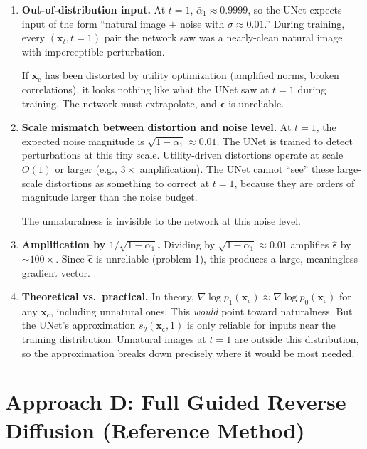 \documentclass[11pt]{article}
\newcommand{\xb}{\mathbf{x}}
\newcommand{\xc}{\xb_{\mathrm{c}}}  %
\newcommand{\eb}{\boldsymbol{\epsilon}}
\newcommand{\alphabar}{\bar{\alpha}}
\begin{document}
\begin{enumerate}
    \item \textbf{Out-of-distribution input.}
    At $t=1$, $\alphabar_1 \approx 0.9999$, so the UNet expects input of the form
    ``natural image $+$ noise with $\sigma \approx 0.01$.'' During training, every
    $({\xb_t}, t{=}1)$ pair the network saw was a nearly-clean natural image with
    imperceptible perturbation.

    If $\xc$ has been distorted by utility optimization (amplified norms, broken
    correlations), it looks nothing like what the UNet saw at $t=1$ during training.
    The network must extrapolate, and $\hat{\eb}$ is unreliable.

    \item \textbf{Scale mismatch between distortion and noise level.}
    At $t=1$, the expected noise magnitude is $\sqrt{1 - \alphabar_1} \approx 0.01$.
    The UNet is trained to detect perturbations at this tiny scale. Utility-driven
    distortions operate at scale $O(1)$ or larger (e.g., $3\times$ amplification).
    The UNet cannot ``see'' these large-scale distortions as something to correct
    at $t=1$, because they are orders of magnitude larger than the noise budget.

    The unnaturalness is invisible to the network at this noise level.

    \item \textbf{Amplification by $1/\sqrt{1-\alphabar_1}$.}
    Dividing by $\sqrt{1 - \alphabar_1} \approx 0.01$ amplifies $\hat{\eb}$ by
    $\sim 100\times$. Since $\hat{\eb}$ is unreliable (problem 1), this produces
    a large, meaningless gradient vector.

    \item \textbf{Theoretical vs.\ practical.}
    In theory, $\nabla \log p_1(\xc) \approx \nabla \log p_0(\xc)$ for any $\xc$,
    including unnatural ones. This \emph{would} point toward naturalness. But the
    UNet's approximation $s_\theta(\xc, 1)$ is only reliable for inputs near the
    training distribution. Unnatural images at $t=1$ are outside this distribution,
    so the approximation breaks down precisely where it would be most needed.
\end{enumerate}


\section{Approach D: Full Guided Reverse Diffusion (Reference Method)}
\end{document}
